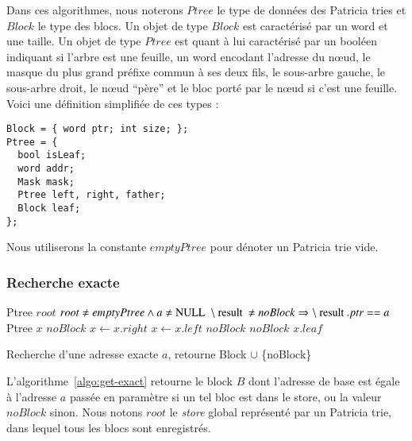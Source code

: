 Dans ces algorithmes, nous noterons $Ptree$ le type de données des Patricia
tries et $Block$ le type des blocs.
Un objet de type $Block$ est caractérisé par un word et une taille.
Un objet de type $Ptree$ est quant à lui caractérisé par un booléen indiquant
si l'arbre est une feuille, un word encodant l'adresse du n\oe{}ud, le masque
du plus grand préfixe commun à ses deux fils, le sous-arbre gauche, le
sous-arbre droit, le n\oe{}ud ``père'' et le bloc porté par le n\oe{}ud si c'est
une feuille.
Voici une définition simplifiée de ces types :

\begin{lstlisting}
Block = { word ptr; int size; };
Ptree = {
  bool isLeaf;
  word addr;
  Mask mask;
  Ptree left, right, father;
  Block leaf;
};
\end{lstlisting}
Nous utiliserons la constante $emptyPtree$ pour dénoter un Patricia trie vide.



\subsubsection*{Recherche exacte}


\begin{algorithm}
\begin{algorithmic}[1]
\Statex Ptree $root$
\Statex
\Require $root \neq emptyPtree \land a \neq \mnull$
\Ensure $\mresult \neq noBlock \Rightarrow \mresult.ptr == a$
\Statex
{}
\State Ptree $x$
    \Return $noBlock$
  \EndIf
    \State $x \gets \mathit{x.right}$
    \State $x \gets \mathit{x.left}$
  \Else{} \Return $noBlock$
  \EndIf
\EndWhile
{}
  \Return $noBlock$
\EndIf{}
\Return $\mathit{x.leaf}$
\EndFunction
\end{algorithmic}
\caption{Recherche d'une adresse exacte $a$, retourne Block $\cup$ \{noBlock\}
  \label{algo:get-exact}}
\end{algorithm}


L'algorithme~\ref{algo:get-exact} retourne le block $B$ dont l'adresse de base
est égale à l'adresse $a$ passée en paramètre si un tel bloc est dans le store,
ou la valeur $noBlock$ sinon.
Nous notons $root$ le {\em store} global représenté par un Patricia trie, dans
lequel tous les blocs sont enregistrés.

